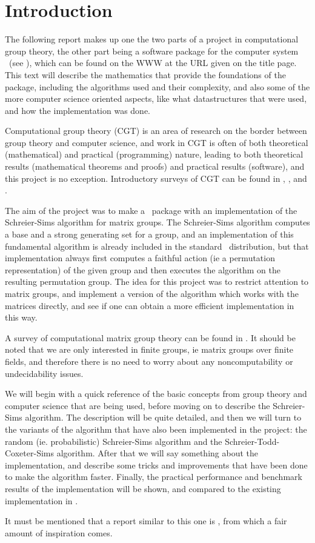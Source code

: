 \chapter{Introduction}
The following report makes up one the two parts of a project in
computational group theory, the other part being a software package
for the computer system \GAP~(see \cite{GAP}), which can be found on
the WWW at the URL given on the title page. This text will describe
the mathematics that provide the foundations of the package, including
the algorithms used and their complexity, and also some of the more
computer science oriented aspects, like what datastructures that were
used, and how the implementation was done.

Computational group theory (CGT) is an area of research on the border
between group theory and computer science, and work in CGT is often of
both theoretical (mathematical) and practical (programming) nature,
leading to both theoretical results (mathematical theorems and proofs)
and practical results (software), and this project is no exception.
Introductory surveys of CGT can be found in \cite{sims98},
\cite{seress97}, \cite{neubuser95} and \cite{cannon92}.

The aim of the project was to make a \GAP~package with an
implementation of the Schreier-Sims algorithm for matrix groups. The
Schreier-Sims algorithm computes a base and a strong generating set
for a group, and an implementation of this fundamental algorithm is
already included in the standard \GAP~distribution, but that
implementation always first computes a faithful action (ie a
permutation representation) of the given group and then executes the
algorithm on the resulting permutation group. The idea for this
project was to restrict attention to matrix groups, and implement a
version of the algorithm which works with the matrices directly, and
see if one can obtain a more efficient implementation in this way.

A survey of computational matrix group theory can be found in
\cite{niemeyer01}. It should be noted that we are only interested in
finite groups, ie matrix groups over finite fields, and therefore
there is no need to worry about any noncomputability or undecidability
issues.

We will begin with a quick reference of the basic concepts from group
theory and computer science that are being used, before moving on to
describe the Schreier-Sims algorithm. The description will be quite
detailed, and then we will turn to the variants of the algorithm that
have also been implemented in the project: the random (ie.
probabilistic) Schreier-Sims algorithm and the
Schreier-Todd-Coxeter-Sims algorithm. After that we will say something
about the implementation, and describe some tricks and
improvements that have been done to make the algorithm faster.
Finally, the practical performance and benchmark results of the
implementation will be shown, and compared to the existing
implementation in \GAP.

It must be mentioned that a report similar to this one is
\cite{murray93}, from which a fair amount of inspiration comes.

